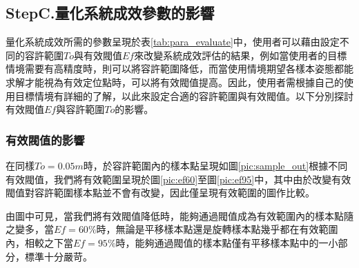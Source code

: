 \subsection{StepC.量化系統成效參數的影響}
\label{chp:effect_evaluate_para}

量化系統成效所需的參數呈現於表\ref{tab:para_evaluate}中，使用者可以藉由設定不同的容許範圍$To$與有效閥值$Ef$來改變系統成效評估的結果，例如當使用者的目標情境需要有高精度時，則可以將容許範圍降低，而當使用情境期望各樣本姿態都能求解才能視為有效定位點時，可以將有效閥值提高。因此，使用者需根據自己的使用目標情境有詳細的了解，以此來設定合適的容許範圍與有效閥值。以下分別探討有效閥值$Ef$與容許範圍$To$的影響。

\subsubsection{有效閥值的影響}
\label{chp:effect_ef}



在同樣$To=0.05m$時，於容許範圍內的樣本點呈現如圖\ref{pic:sample_out}根據不同有效閥值，我們將有效範圍呈現於圖\ref{pic:ef60}至圖\ref{pic:ef95}中，其中由於改變有效閥值對容許範圍樣本點並不會有改變，因此僅呈現有效範圍的圖作比較。

由圖中可見，當我們將有效閥值降低時，能夠通過閥值成為有效範圍內的樣本點隨之變多，當$Ef=60\%$時，無論是平移樣本點還是旋轉樣本點幾乎都在有效範圍內，相較之下當$Ef=95\%$時，能夠通過閥值的樣本點僅有平移樣本點中的一小部分，標準十分嚴苛。



